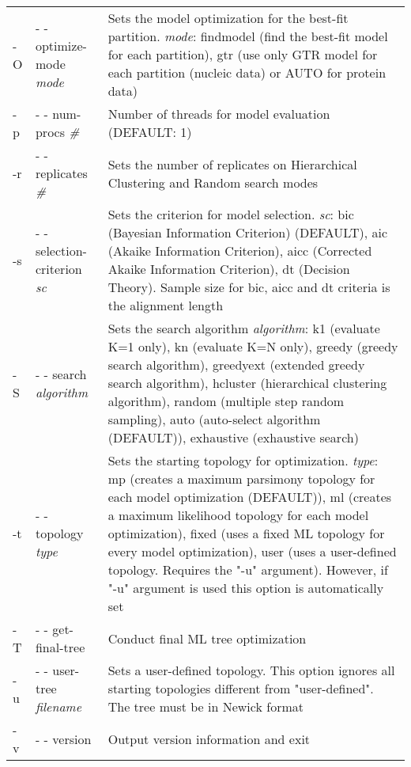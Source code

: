 \documentclass[11pt,twoside,a4paper]{article}
\begin{document}
\begin{flushleft}
{\begin{tabular}{@{}llp{.7\linewidth}@{}}
-O& - - optimize-mode {\it mode}
  &     Sets  the  model optimization for the best-fit partition. {\it mode}: findmodel (find the best-fit model for each partition), gtr (use only GTR model for each partition (nucleic data)
or AUTO for protein data) \\

-p& - - num-procs {\it \#}
  &     Number of threads for model evaluation (DEFAULT: 1) \\

-r& - - replicates {\it \#}
  &     Sets the number of replicates on Hierarchical Clustering and Random search modes \\

-s& - - selection-criterion {\it sc}
  &     Sets the criterion for model selection. {\it sc}: bic (Bayesian Information Criterion) (DEFAULT), aic (Akaike Information Criterion), aicc (Corrected Akaike Information  Criterion),  dt
(Decision Theory). Sample size for bic, aicc and dt criteria is the alignment length \\

-S& - - search {\it algorithm}
  &     Sets  the  search  algorithm  {\it algorithm}:  k1  (evaluate K=1 only), kn (evaluate K=N only), greedy (greedy search algorithm), greedyext (extended greedy search algorithm), hcluster
(hierarchical clustering algorithm), random (multiple step random sampling), auto (auto-select algorithm (DEFAULT)), exhaustive (exhaustive search) \\

-t& - - topology {\it type}
  &     Sets the starting topology for optimization. {\it type}: mp (creates a maximum parsimony topology for each model optimization (DEFAULT)), ml (creates a maximum likelihood topology
for each model optimization), fixed (uses a fixed ML topology for every model optimization), user (uses a user-defined topology. Requires the "-u" argument). However, if "-u" argument is
used this option is automatically set \\

-T& - - get-final-tree
  &     Conduct final ML tree optimization \\

-u& - - user-tree {\it filename}
  &     Sets a user-defined topology. This option ignores all starting topologies different from "user-defined". The tree must be in Newick format \\

-v& - - version
  &     Output version information and exit \\
\end{tabular}
}
\end{flushleft}
\end{document}
